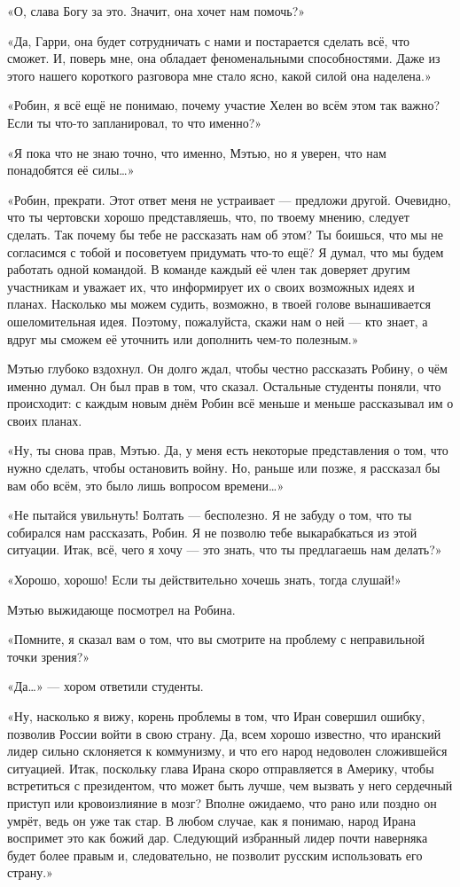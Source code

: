 \documentclass[a5paper, 9pt,
final, openany, twoside=true]{memoir}
\begin{document}
«О, слава Богу за это. Значит, она хочет нам помочь?»

«Да, Гарри, она будет сотрудничать с нами и постарается сделать всё, что сможет. И, поверь мне, она обладает феноменальными способностями. Даже из этого нашего короткого разговора мне стало ясно, какой силой она наделена.»

«Робин, я всё ещё не понимаю, почему участие Хелен во всём этом так важно? Если ты что-то запланировал, то что именно?»

	«Я пока что не знаю точно, что именно, Мэтью, но я уверен, что нам понадобятся её силы…»

«Робин, прекрати. Этот ответ меня не устраивает — предложи другой. Очевидно, что ты чертовски хорошо представляешь, что, по твоему мнению, следует сделать. Так почему бы тебе не рассказать нам об этом? Ты боишься, что мы не согласимся с тобой и посоветуем придумать что-то ещё? Я думал, что мы будем работать одной командой. В команде каждый её член так доверяет другим участникам и уважает их, что информирует их о своих возможных идеях и планах. Насколько мы можем судить, возможно, в твоей голове вынашивается ошеломительная идея. Поэтому, пожалуйста, скажи нам о ней — кто знает, а вдруг мы сможем её уточнить или дополнить чем-то полезным.»

Мэтью глубоко вздохнул. Он долго ждал, чтобы честно рассказать Робину, о чём именно думал. Он был прав в том, что сказал. Остальные студенты поняли, что происходит: с каждым новым днём Робин всё меньше и меньше рассказывал им о своих планах.

«Ну, ты снова прав, Мэтью. Да, у меня есть некоторые представления о том, что нужно сделать, чтобы остановить войну. Но, раньше или позже, я рассказал бы вам обо всём, это было лишь вопросом времени…»

«Не пытайся увильнуть! Болтать — бесполезно. Я не забуду о том, что ты собирался нам рассказать, Робин. Я не позволю тебе выкарабкаться из этой ситуации. Итак, всё, чего я хочу — это знать, что ты предлагаешь нам делать?»

«Хорошо, хорошо! Если ты действительно хочешь знать, тогда слушай!»

Мэтью выжидающе посмотрел на Робина.

«Помните, я сказал вам о том, что вы смотрите на проблему с неправильной точки зрения?»

«Да…» — хором ответили студенты.

«Ну, насколько я вижу, корень проблемы в том, что Иран совершил ошибку, позволив России войти в свою страну. Да, всем хорошо известно, что иранский лидер сильно склоняется к коммунизму, и что его народ недоволен сложившейся ситуацией. Итак, поскольку глава Ирана скоро отправляется в Америку, чтобы встретиться с президентом, что может быть лучше, чем вызвать у него сердечный приступ или кровоизлияние в мозг? Вполне ожидаемо, что рано или поздно он умрёт, ведь он уже так стар. В любом случае, как я понимаю, народ Ирана воспримет это как божий дар. Следующий избранный лидер почти наверняка будет более правым и, следовательно, не позволит русским использовать его страну.»
\end{document}
